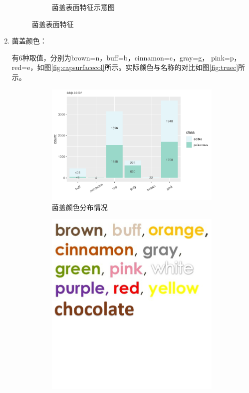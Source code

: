 \documentclass[lang=cn,11pt,a4paper,cite=super]{elegantpaper}
\begin{document}
\begin{enumerate}
\begin{figure}[htb]
\begin{subfigure}[b]{0.3\textwidth}
        \caption{菌盖表面特征示意图}
      \end{subfigure}
      \caption{菌盖表面特征}
      \label{fig:capsurface}
   \end{figure}
   \item 菌盖颜色：\par 有6种取值，分别为brown=n，buff=b，cinnamon=c，gray=g，
   pink=p，red=e，如图\ref{fig:capsurfacecol}所示。实际颜色与名称的对比如图\ref{fig:truec}所示。
   \begin{figure}[htb]
      \begin{subfigure}[b]{0.69\textwidth}
        \centering
        \includegraphics[width=\linewidth]{img/capcolor-1.pdf}  
      \caption{菌盖颜色分布情况}
      \end{subfigure}
      \begin{subfigure}[b]{0.3\textwidth}
        \centering
        \includegraphics[width=\linewidth]{img/color.PNG}  

\end{subfigure}
\end{figure}
\end{enumerate}
\end{document}
